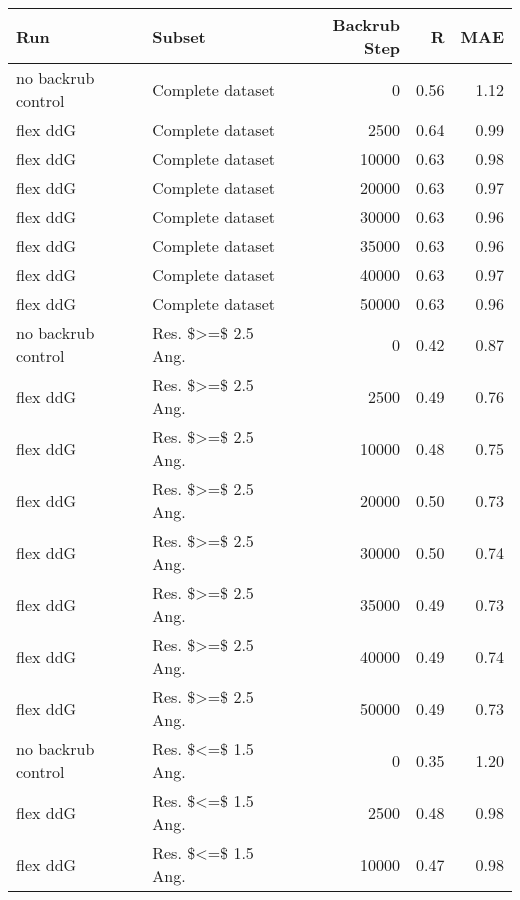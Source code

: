 \begin{table}
\begin{tabular}{llrrr}
\toprule
                Run &                          Subset &  Backrub Step &    R &  MAE \\
\midrule
 no backrub control &                Complete dataset &             0 & 0.56 & 1.12 \\
           flex ddG &                Complete dataset &          2500 & 0.64 & 0.99 \\
           flex ddG &                Complete dataset &         10000 & 0.63 & 0.98 \\
           flex ddG &                Complete dataset &         20000 & 0.63 & 0.97 \\
           flex ddG &                Complete dataset &         30000 & 0.63 & 0.96 \\
           flex ddG &                Complete dataset &         35000 & 0.63 & 0.96 \\
           flex ddG &                Complete dataset &         40000 & 0.63 & 0.97 \\
           flex ddG &                Complete dataset &         50000 & 0.63 & 0.96 \\
 no backrub control &              Res. \$>=\$ 2.5 Ang. &             0 & 0.42 & 0.87 \\
           flex ddG &              Res. \$>=\$ 2.5 Ang. &          2500 & 0.49 & 0.76 \\
           flex ddG &              Res. \$>=\$ 2.5 Ang. &         10000 & 0.48 & 0.75 \\
           flex ddG &              Res. \$>=\$ 2.5 Ang. &         20000 & 0.50 & 0.73 \\
           flex ddG &              Res. \$>=\$ 2.5 Ang. &         30000 & 0.50 & 0.74 \\
           flex ddG &              Res. \$>=\$ 2.5 Ang. &         35000 & 0.49 & 0.73 \\
           flex ddG &              Res. \$>=\$ 2.5 Ang. &         40000 & 0.49 & 0.74 \\
           flex ddG &              Res. \$>=\$ 2.5 Ang. &         50000 & 0.49 & 0.73 \\
 no backrub control &              Res. \$<=\$ 1.5 Ang. &             0 & 0.35 & 1.20 \\
           flex ddG &              Res. \$<=\$ 1.5 Ang. &          2500 & 0.48 & 0.98 \\
           flex ddG &              Res. \$<=\$ 1.5 Ang. &         10000 & 0.47 & 0.98 \\

\end{tabular}
\end{table}
